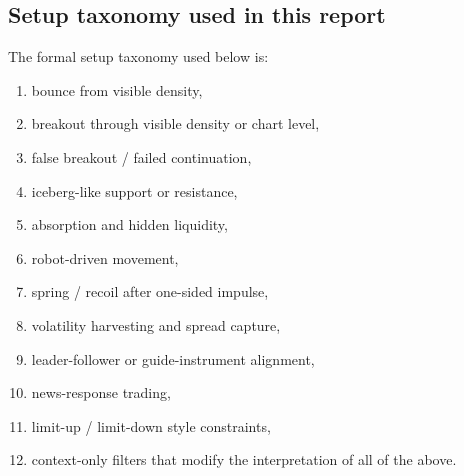 
\subsection{Setup taxonomy used in this report}

The formal setup taxonomy used below is:

\begin{enumerate}
\item bounce from visible density,
\item breakout through visible density or chart level,
\item false breakout / failed continuation,
\item iceberg-like support or resistance,
\item absorption and hidden liquidity,
\item robot-driven movement,
\item spring / recoil after one-sided impulse,
\item volatility harvesting and spread capture,
\item leader-follower or guide-instrument alignment,
\item news-response trading,
\item limit-up / limit-down style constraints,
\item context-only filters that modify the interpretation of all of the above.
\end{enumerate}

